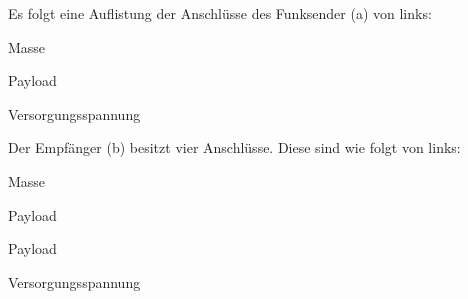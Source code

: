 \begin{figure}[H]
	\hspace*{-2cm}
	\caption{\funkempfaenger}
	\label{img:433_sender_empf}
\end{figure}

Es folgt eine Auflistung der Anschlüsse des Funksender (a) von links:

\begin{description}[style=multiline,leftmargin=3cm]
\item [GND] 	Masse
\item [DATA]	Payload
\item [VCC]		Versorgungsspannung
\end{description}

Der Empfänger (b) besitzt vier Anschlüsse. Diese sind wie folgt von links:

\begin{description}[style=multiline,leftmargin=3cm]
\item [GND] 	Masse
\item [DATA]	Payload
\item [DATA]	Payload
\item [VCC]		Versorgungsspannung
\end{description}

